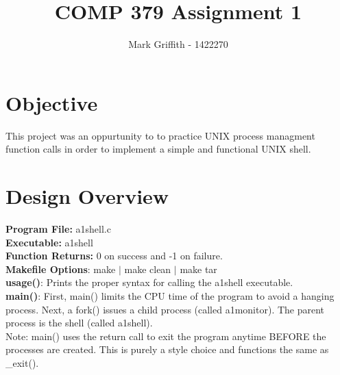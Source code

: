 \documentclass{article}
\begin{document}
\title{COMP 379 Assignment 1}
\author{Mark Griffith - 1422270}

\maketitle

\section{Objective}
This project was an oppurtunity to to practice UNIX process managment function calls
in order to implement a simple and functional UNIX shell.

\section{Design Overview}
\textbf{Program File:} a1shell.c \\
\textbf{Executable:} a1shell \\
\textbf{Function Returns:} 0 on success and -1 on failure. \\
\textbf{Makefile Options}: make $|$ make clean $|$ make tar \\

\noindent
\textbf{usage()}: Prints the proper syntax for calling the a1shell executable. \\

\noindent
\textbf{main()}: First, main() limits the CPU time of the program to avoid a hanging
process.
Next, a fork() issues a child process (called a1monitor). The parent process is the
shell (called a1shell). \\
\noindent
Note: main() uses the return call to exit the program anytime BEFORE the processes
are created. This is purely a style choice and functions the same as \_exit(). \\
\end{document}
